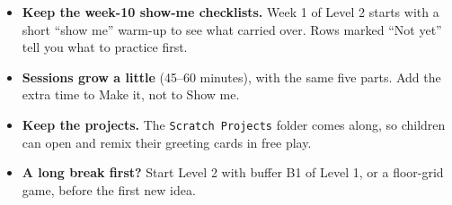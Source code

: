\documentclass[track=junior,level=1,teacher]{kidscode}
\begin{document}
\begin{itemize}[itemsep=2pt]
  \item \textbf{Keep the week-10 show-me checklists.} Week 1 of Level 2 starts with a short
        \enquote{show me} warm-up to see what carried over. Rows marked \enquote{Not yet} tell you
        what to practice first.
  \item \textbf{Sessions grow a little} (45--60 minutes), with the same five parts. Add the extra time
        to Make it, not to Show me.
  \item \textbf{Keep the projects.} The \texttt{Scratch Projects} folder comes along, so children can
        open and remix their greeting cards in free play.
  \item \textbf{A long break first?} Start Level 2 with buffer B1 of Level 1, or a floor-grid game,
        before the first new idea.
\end{itemize}
\end{document}
